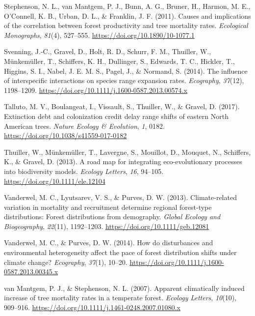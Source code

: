 \documentclass[
]{article}
\begin{document}
\leavevmode\hypertarget{ref-stephenson_causes_2011}{}%
Stephenson, N. L., van Mantgem, P. J., Bunn, A. G., Bruner, H., Harmon,
M. E., O'Connell, K. B., Urban, D. L., \& Franklin, J. F. (2011). Causes
and implications of the correlation between forest productivity and tree
mortality rates. \emph{Ecological Monographs}, \emph{81}(4), 527--555.
\url{https://doi.org/10.1890/10-1077.1}

\leavevmode\hypertarget{ref-svenning_influence_2014}{}%
Svenning, J.-C., Gravel, D., Holt, R. D., Schurr, F. M., Thuiller, W.,
Münkemüller, T., Schiffers, K. H., Dullinger, S., Edwards, T. C.,
Hickler, T., Higgins, S. I., Nabel, J. E. M. S., Pagel, J., \& Normand,
S. (2014). The influence of interspecific interactions on species range
expansion rates. \emph{Ecography}, \emph{37}(12), 1198--1209.
\url{https://doi.org/10.1111/j.1600-0587.2013.00574.x}

\leavevmode\hypertarget{ref-talluto_extinction_2017}{}%
Talluto, M. V., Boulangeat, I., Vissault, S., Thuiller, W., \& Gravel,
D. (2017). Extinction debt and colonization credit delay range shifts of
eastern North American trees. \emph{Nature Ecology \& Evolution},
\emph{1}, 0182. \url{https://doi.org/10.1038/s41559-017-0182}

\leavevmode\hypertarget{ref-thuiller_road_2013}{}%
Thuiller, W., Münkemüller, T., Lavergne, S., Mouillot, D., Mouquet, N.,
Schiffers, K., \& Gravel, D. (2013). A road map for integrating
eco-evolutionary processes into biodiversity models. \emph{Ecology
Letters}, \emph{16}, 94--105. \url{https://doi.org/10.1111/ele.12104}

\leavevmode\hypertarget{ref-vanderwel_climate-related_2013}{}%
Vanderwel, M. C., Lyutsarev, V. S., \& Purves, D. W. (2013).
Climate-related variation in mortality and recruitment determine
regional forest-type distributions: Forest distributions from
demography. \emph{Global Ecology and Biogeography}, \emph{22}(11),
1192--1203. \url{https://doi.org/10.1111/geb.12081}

\leavevmode\hypertarget{ref-vanderwel_how_2014}{}%
Vanderwel, M. C., \& Purves, D. W. (2014). How do disturbances and
environmental heterogeneity affect the pace of forest distribution
shifts under climate change? \emph{Ecography}, \emph{37}(1), 10--20.
\url{https://doi.org/10.1111/j.1600-0587.2013.00345.x}

\leavevmode\hypertarget{ref-van_mantgem_apparent_2007}{}%
van Mantgem, P. J., \& Stephenson, N. L. (2007). Apparent climatically
induced increase of tree mortality rates in a temperate forest.
\emph{Ecology Letters}, \emph{10}(10), 909--916.
\url{https://doi.org/10.1111/j.1461-0248.2007.01080.x}
\end{document}
